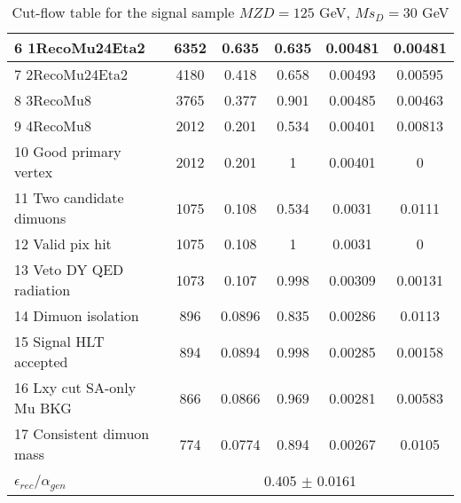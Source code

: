 \documentclass{article}
\begin{document}
\begin{table}
\begin{tabular}{| l| c | c | c | c | c |}
 6  1RecoMu24Eta2             & 6352        & 0.635         & 0.635         & 0.00481          & 0.00481        \\ \hline 
 7  2RecoMu24Eta2           & 4180        & 0.418         & 0.658         & 0.00493          & 0.00595            \\ \hline 
 8  3RecoMu8                 & 3765        & 0.377         & 0.901         & 0.00485          & 0.00463        \\ \hline 
 9  4RecoMu8                 & 2012        & 0.201         & 0.534         & 0.00401          & 0.00813        \\ \hline 
 10 Good primary vertex     & 2012        & 0.201         & 1             & 0.00401          & 0                  \\ \hline 
 11 Two candidate dimuons    & 1075        & 0.108         & 0.534         & 0.0031           & 0.0111            \\ \hline 
 12 Valid pix hit            & 1075        & 0.108         & 1             & 0.0031           & 0           \\ \hline 
 13 Veto DY QED radiation    & 1073        & 0.107         & 0.998         & 0.00309          & 0.00131          \\ \hline 
 14 Dimuon isolation         & 896         & 0.0896        & 0.835         & 0.00286          & 0.0113          \\ \hline 
 15 Signal HLT accepted       & 894         & 0.0894        & 0.998         & 0.00285          & 0.00158         \\ \hline 
 16 Lxy cut SA-only Mu BKG   & 866         & 0.0866        & 0.969         & 0.00281          & 0.00583          \\ \hline 
 17 Consistent dimuon mass    & 774         & 0.0774        & 0.894         & 0.00267          & 0.0105           \\ \hline 

  $\epsilon_{rec}$/$\alpha_{gen}$ & \multicolumn{5}{|c|}{0.405 $\pm$ 0.0161} \\ \hline
\end{tabular}
\caption{Cut-flow table for the signal sample $MZ{D} = 125$ GeV, $Ms_{D}= 30$ GeV}
\end{table}
\end{document}
